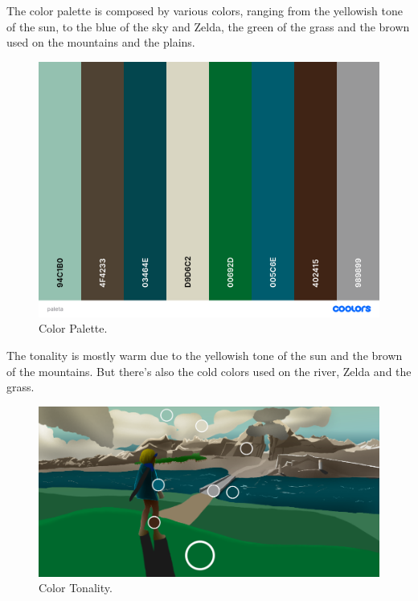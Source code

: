 \documentclass{cup-pan}
\begin{document}
            The color palette is composed by various colors, ranging from the yellowish tone of the sun, to the blue of the sky and Zelda, the green of the grass and the brown used on the mountains and the plains.\\
            \begin{figure}[H]
                \includegraphics[width=\textwidth]{Imagenes/Fanart1/Analysis/paleta.png}
                \caption{Color Palette.}
            \end{figure}

            The tonality is mostly warm due to the yellowish tone of the sun and the brown of the mountains. But there's also the cold colors used on the river, Zelda and the grass.\\
            \begin{figure}[H]
                \includegraphics[width=\textwidth]{Imagenes/Fanart1/Analysis/tonalidad.png}
                \caption{Color Tonality.}
            \end{figure}
\end{document}

